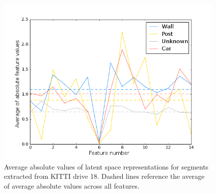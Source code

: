 \begin{figure}
  \centering
  \includegraphics[width=5.2in]{images/avg_abs_features.png}
  \caption{Average absolute values of latent space representations for segments extracted from KITTI drive 18. Dashed lines reference the average of average absolute values across all features.}
  \label{fig:avg_abs_features}
\end{figure}

